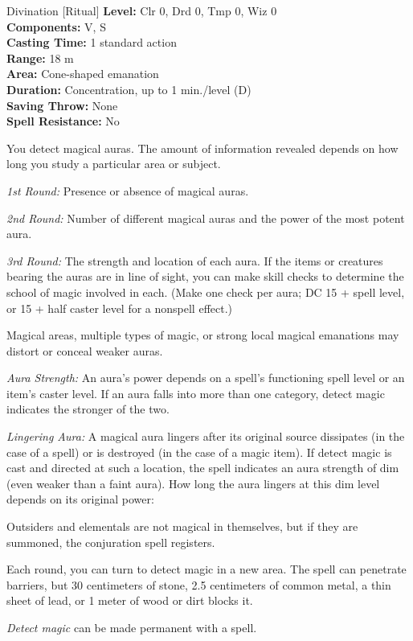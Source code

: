 {Divination [Ritual]}
{
	\textbf{Level:}
	Clr 0, Drd 0, Tmp 0, Wiz 0\\
	\textbf{Components:}
	V, S\\
	\textbf{Casting Time:}
	1 standard action\\
	\textbf{Range:}
	18 m\\
	\textbf{Area:}
	Cone-shaped emanation\\
	\textbf{Duration:}
	Concentration, up to 1 min./level (D)\\
	\textbf{Saving Throw:}
	None\\
	\textbf{Spell Resistance:}
	No\\
}
{
	You detect magical auras. The amount of information revealed depends on how long you study a particular area or subject.

	\textit{1st Round:}
	Presence or absence of magical auras.

	\textit{2nd Round:}
	Number of different magical auras and the power of the most potent aura.

	\textit{3rd Round:}
	The strength and location of each aura. If the items or creatures bearing the auras are in line of sight, you can make  skill checks to determine the school of magic involved in each. (Make one check per aura; DC 15 + spell level, or 15 + half caster level for a nonspell effect.)

	Magical areas, multiple types of magic, or strong local magical emanations may distort or conceal weaker auras.

	\textit{Aura Strength:}
	An aura's power depends on a spell's functioning spell level or an item's caster level. If an aura falls into more than one category, detect magic indicates the stronger of the two.

	\textit{Lingering Aura:}
	A magical aura lingers after its original source dissipates (in the case of a spell) or is destroyed (in the case of a magic item). If detect magic is cast and directed at such a location, the spell indicates an aura strength of dim (even weaker than a faint aura). How long the aura lingers at this dim level depends on its original power:


	Outsiders and elementals are not magical in themselves, but if they are summoned, the conjuration spell registers.

	Each round, you can turn to detect magic in a new area. The spell can penetrate barriers, but 30 centimeters of stone, 2.5 centimeters of common metal, a thin sheet of lead, or 1 meter of wood or dirt blocks it.

	\emph{Detect magic} can be made permanent with a  spell.

}
